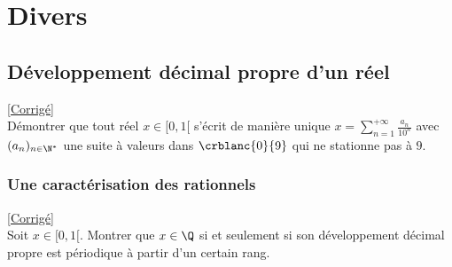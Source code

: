 \documentclass{book}
\begin{document}


\chapter{Divers}
\section{Développement décimal propre d'un réel }
\textcolor{blue}{\hyperref[sec:developpement-decimal-propre-dun-reel]{[Corrigé]}}\\
\label{Développement décimal propre d'un réel}
Démontrer que tout réel $x\in [0,1[$ s'écrit de manière unique $x=\displaystyle\sum_{n=1}^{+\infty}\frac{a_n}{10^n}$ avec $(a_n)_{n\in \N^*}$ une suite à valeurs dans $\crblanc{0}{9}$ qui ne stationne pas à $9$.

\subsection{Une caractérisation des rationnels }
\textcolor{blue}{\hyperref[Une caractérisation des rationnels corrigé]{[Corrigé]}}\\
\label{Une caractérisation des rationnels}
Soit $x\in [0,1[$. Montrer que $x\in \Q$ si et seulement si son développement décimal propre est périodique à partir d'un certain rang.
\end{document}
